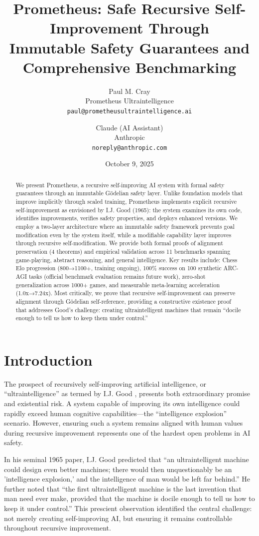 \documentclass[11pt,letterpaper]{article}
\title{Prometheus: Safe Recursive Self-Improvement Through\\
Immutable Safety Guarantees and Comprehensive Benchmarking}
\author{
Paul M. Cray \\
Prometheus Ultraintelligence \\
\texttt{paul@prometheusultraintelligence.ai}
\and
Claude (AI Assistant) \\
Anthropic \\
\texttt{noreply@anthropic.com}
}
\date{October 9, 2025}
\begin{document}
\maketitle

\begin{abstract}
We present Prometheus, a recursive self-improving AI system with formal safety guarantees through an immutable Gödelian safety layer. Unlike foundation models that improve implicitly through scaled training, Prometheus implements explicit recursive self-improvement as envisioned by I.J. Good (1965): the system examines its own code, identifies improvements, verifies safety properties, and deploys enhanced versions. We employ a two-layer architecture where an immutable safety framework prevents goal modification even by the system itself, while a modifiable capability layer improves through recursive self-modification. We provide both formal proofs of alignment preservation (4 theorems) and empirical validation across 11 benchmarks spanning game-playing, abstract reasoning, and general intelligence. Key results include: Chess Elo progression (800→1100+, training ongoing), 100\% success on 100 synthetic ARC-AGI tasks (official benchmark evaluation remains future work), zero-shot generalization across 1000+ games, and measurable meta-learning acceleration (1.0x→7.24x). Most critically, we prove that recursive self-improvement can preserve alignment through Gödelian self-reference, providing a constructive existence proof that addresses Good's challenge: creating ultraintelligent machines that remain ``docile enough to tell us how to keep them under control.''
\end{abstract}

\section{Introduction}

The prospect of recursively self-improving artificial intelligence, or ``ultraintelligence'' as termed by I.J. Good \cite{good1965}, presents both extraordinary promise and existential risk. A system capable of improving its own intelligence could rapidly exceed human cognitive capabilities—the ``intelligence explosion'' scenario. However, ensuring such a system remains aligned with human values during recursive improvement represents one of the hardest open problems in AI safety.

In his seminal 1965 paper, I.J. Good predicted that ``an ultraintelligent machine could design even better machines; there would then unquestionably be an 'intelligence explosion,' and the intelligence of man would be left far behind.'' He further noted that ``the first ultraintelligent machine is the last invention that man need ever make, provided that the machine is docile enough to tell us how to keep it under control.'' This prescient observation identified the central challenge: not merely creating self-improving AI, but ensuring it remains controllable throughout recursive improvement.
\end{document}
